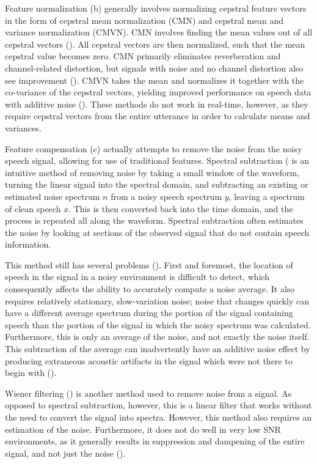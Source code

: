 Feature normalization (b) generally involves normalizing cepstral feature vectors in the form of cepstral mean normalization (CMN) and cepstral mean and variance normalization (CMVN).  CMN involves finding the mean values out of all cepstral vectors (\cite{atal:74}).  All cepstral vectors are then normalized, such that the mean cepstral value becomes zero.  CMN primarily eliminates reverberation and channel-related distortion, but signals with noise and no channel distortion also see improvement (\cite{droppo:08}).  CMVN takes the mean and normalizes it together with the co-variance of the cepstral vectors, yielding improved performance on speech data with additive noise (\cite{viikki:98}).
These methods do not work in real-time, however, as they require cepstral vectors from the entire utterance in order to calculate means and variances.

Feature compensation (c) actually attempts to remove the noise from the noisy speech signal, allowing for use of traditional features. Spectral subtraction (\cite{boll:79} is an intuitive method of removing noise by taking a small window of the waveform, turning the linear signal into the spectral domain, and subtracting an existing or estimated noise spectrum $n$ from a noisy speech spectrum $y$, leaving a spectrum of clean speech $x$.  This is then converted back into the time domain, and the process is repeated all along the waveform.  Spectral subtraction often estimates the noise by looking at sections of the observed signal that do not contain speech information.  

This method still has several problems (\cite{li:14}). First and foremost, the location of speech in the signal in a noisy environment is difficult to detect, which consequently affects the ability to accurately compute a noise average. It also requires relatively stationary, slow-variation noise; noise that changes quickly can have a different average spectrum during the portion of the signal containing speech than the portion of the signal in which the noisy spectrum was calculated.  Furthermore, this is only an average of the noise, and not exactly the noise itself.  This subtraction of the average can inadvertently have an additive noise effect by producing extraneous acoustic artifacts in the \DIFdelbegin {}\DIFdelend \DIFaddbegin {}\DIFaddend signal which were not there to begin with (\cite{berouti:79}).

Wiener filtering (\cite{lim:79}) is another method used to remove noise from a signal.  As opposed to spectral subtraction, however, this is a linear filter that works without the need to convert the signal into spectra.  However, this method also requires an estimation of the noise.  Furthermore, it does not do well in very low SNR environments, as it generally results in suppression and dampening of the entire signal, and not just the noise (\cite{li:14}).

